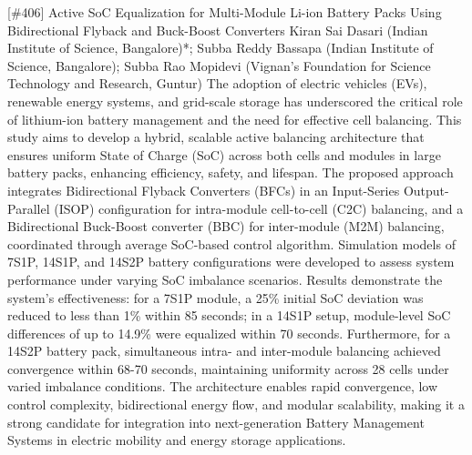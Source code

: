 {} \begin{abstract_online} {[\#406] Active SoC Equalization for Multi-Module Li-ion Battery Packs Using Bidirectional Flyback and Buck-Boost Converters} {} {Kiran Sai Dasari (Indian Institute of Science, Bangalore)*; Subba Reddy  Bassapa (Indian Institute of Science, Bangalore); Subba Rao Mopidevi (Vignan's Foundation for Science Technology and Research, Guntur)} {} The adoption of electric vehicles (EVs), renewable energy systems, and grid-scale storage has underscored the critical role of lithium-ion battery management and the need for effective cell balancing. This study aims to develop a hybrid, scalable active balancing architecture that ensures uniform State of Charge (SoC) across both cells and modules in large battery packs, enhancing efficiency, safety, and lifespan. The proposed approach integrates Bidirectional Flyback Converters (BFCs) in an Input-Series Output-Parallel (ISOP) configuration for intra-module cell-to-cell (C2C) balancing, and a Bidirectional Buck-Boost converter (BBC) for inter-module (M2M) balancing, coordinated through average SoC-based control algorithm. Simulation models of 7S1P, 14S1P, and 14S2P battery configurations were developed to assess system performance under varying SoC imbalance scenarios. Results demonstrate the system's effectiveness: for a 7S1P module, a 25\% initial SoC deviation was reduced to less than 1\% within 85 seconds; in a 14S1P setup, module-level SoC differences of up to 14.9\% were equalized within 70 seconds. Furthermore, for a 14S2P battery pack, simultaneous intra- and inter-module balancing achieved convergence within 68-70 seconds, maintaining uniformity across 28 cells under varied imbalance conditions. The architecture enables rapid convergence, low control complexity, bidirectional energy flow, and modular scalability, making it a strong candidate for integration into next-generation Battery Management Systems in electric mobility and energy storage applications. \end{abstract_online} 
